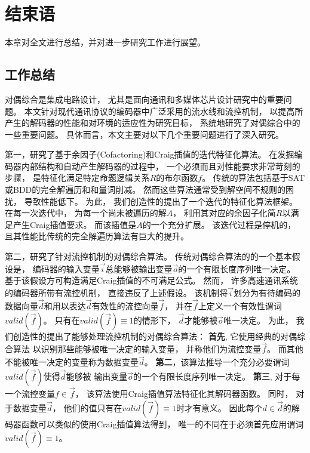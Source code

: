 \chapter{结束语}
\label{chap:8}
本章对全文进行总结，并对进一步研究工作进行展望。

\section{工作总结}
对偶综合是集成电路设计，
尤其是面向通讯和多媒体芯片设计研究中的重要问题。
本文针对现代通讯协议的编码器中广泛采用的流水线和流控机制，
以提高所产生的解码器的性能和对环境的适应性为研究目标，
系统地研究了对偶综合中的一些重要问题。
具体而言，本文主要对以下几个重要问题进行了深入研究。

第一，研究了基于余因子(Cofactoring)和Craig插值的迭代特征化算法。
在发掘编码器内部结构和自动产生解码器的过程中，
一个必须而且对性能要求非常苛刻的步骤，
是特征化满足特定命题逻辑关系$R$的布尔函数$f$。
传统的算法包括基于SAT或BDD的完全解遍历和和量词削减。
然而这些算法通常受到解空间不规则的困扰，
导致性能低下。
为此，
我们创造性的提出了一个迭代的特征化算法框架。
在每一次迭代中，
为每一个尚未被遍历的解$A$，
利用其对应的余因子化简$R$以满足产生Craig插值要求。
而该插值是$A$的一个充分扩展。
该迭代过程是停机的，
且其性能比传统的完全解遍历算法有巨大的提升。

第二，研究了针对流控机制的对偶综合算法。
传统对偶综合算法的的一个基本假设是，
编码器的输入变量$\vec{i}$总能够被输出变量$\vec{o}$的一个有限长度序列唯一决定。
基于该假设方可构造满足Craig插值的不可满足公式。
然而，
许多高速通讯系统的编码器所带有流控机制，
直接违反了上述假设。
该机制将$\vec{i}$划分为有待编码的数据向量$\vec{d}$和用以表达$\vec{d}$有效性的流控向量$\vec{f}$，
并在$\vec{f}$上定义一个有效性谓词$valid(\vec{f})$。
只有在$valid(\vec{f})\equiv 1$的情形下，
$\vec{d}$才能够被$\vec{o}$唯一决定。
为此，
我们创造性的提出了能够处理流控机制的对偶综合算法：
\textbf{首先},
它使用经典的对偶综合算法
以识别那些能够被唯一决定的输入变量，
并称他们为流控变量$\vec{f}$。
而其他不能被唯一决定的变量称为数据变量$\vec{d}$。
\textbf{第二}，该算法推导一个充分必要谓词$valid(\vec{f})$使得$\vec{d}$能够被
输出变量$\vec{o}$的一个有限长度序列唯一决定。
\textbf{第三},
对于每一个流控变量$f\in\vec{f}$，
该算法使用Craig插值算法特征化其解码器函数。
同时，
对于数据变量$\vec{d}$，
他们的值只有在$valid(\vec{f}) \equiv 1$时才有意义。
因此每个$d\in\vec{d}$的解码器函数可以类似的使用Craig插值算法得到，
唯一的不同在于必须首先应用谓词$valid(\vec{f}) \equiv 1$。



